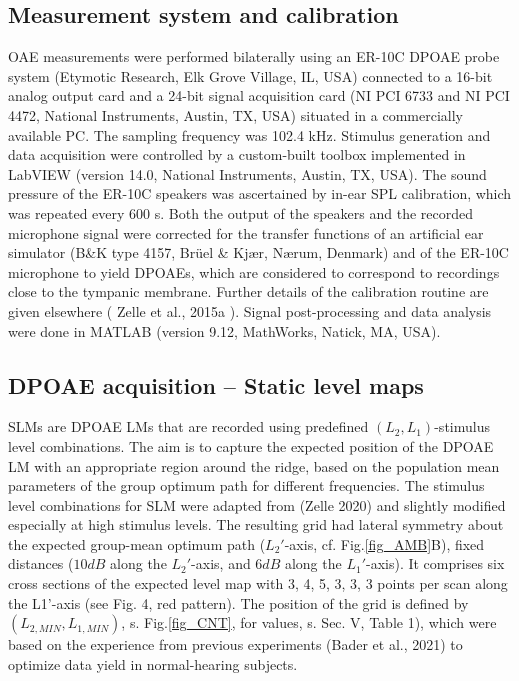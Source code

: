 \documentclass[journal,twoside,web]{ieeecolor2}
\begin{document}
\subsection{Measurement system and calibration}
OAE measurements were performed bilaterally using an ER-10C DPOAE probe system (Etymotic Research, Elk Grove Village, IL, USA) connected to a 16-bit analog output card and a 24-bit signal acquisition card (NI PCI 6733 and NI PCI 4472, National Instruments, Austin, TX, USA) situated in a commercially available PC. The sampling frequency was 102.4 kHz. Stimulus generation and data acquisition were controlled by a custom-built toolbox implemented in LabVIEW (version 14.0, National Instruments, Austin, TX, USA). The sound pressure of the ER-10C speakers was ascertained by in-ear SPL calibration, which was repeated every 600 s. Both the output of the speakers and the recorded microphone signal were corrected for the transfer functions of an artificial ear simulator (B\&K type 4157, Brüel \& Kjær, Nærum, Denmark) and of the ER-10C microphone to yield DPOAEs, which are considered to correspond to recordings close to the tympanic membrane. Further details of the calibration routine are given elsewhere ( Zelle et al., 2015a ). Signal post-processing and data analysis were done in MATLAB (version 9.12, MathWorks, Natick, MA, USA).

\subsection{DPOAE acquisition – Static level maps}
SLMs are DPOAE LMs that are recorded using predefined $(L_2, L_1)$-stimulus level combinations. The aim is to capture the expected position of the DPOAE LM with an appropriate region around the ridge, based on the population mean parameters of the group optimum path for different frequencies. The stimulus level combinations for SLM were adapted from (Zelle 2020) and slightly modified especially at high stimulus levels. The resulting grid had lateral symmetry about the expected group-mean optimum path ($L_2'$-axis, cf. Fig.\ref{fig_AMB}B), fixed distances ($10 dB$ along the $L_2'$-axis, and $6 dB$ along the $L_1'$-axis). It comprises six cross sections of the expected level map with 3, 4, 5, 3, 3, 3 points per scan along the L1'-axis (see Fig. 4, red pattern). The position of the grid is defined by $(L_{2,MIN} , L_{1,MIN})$, s. Fig.\ref{fig_CNT}, for values,  s. Sec. V, Table 1), which were based on the experience from previous experiments (Bader et al., 2021) to optimize data yield in normal-hearing subjects.
\end{document}
